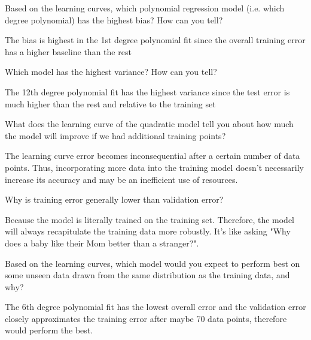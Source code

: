 \begin{solution}
  \end{solution}

\begin{problem}[3]
  Based on the learning curves, which polynomial regression model (i.e. which degree polynomial) has the highest bias? How can you tell?
\end{problem}
\begin{solution}
The bias is highest in the 1st degree polynomial fit since the overall training error has a higher baseline than the rest
\end{solution}

\begin{problem}[3]
  Which model has the highest variance? How can you tell?
\end{problem}
\begin{solution}
  The 12th degree polynomial fit has the highest variance since the test error is much higher than the rest and relative to the training set
\end{solution}

\begin{problem}[3]
  What does the learning curve of the quadratic model tell you about how much the model will improve if we had additional training points?
\end{problem}
\begin{solution}
The learning curve error becomes inconsequential after a certain number of data points. Thus, incorporating more data into the training model doesn't necessarily increase its accuracy and may be an inefficient use of resources.
\end{solution}

\begin{problem}[3]
  Why is training error generally lower than validation error?
\end{problem}
\begin{solution}
  Because the model is literally trained on the training set. Therefore, the model will always recapitulate the training data more robustly. It's like asking "Why does a baby like their Mom better than a stranger?". 
\end{solution}

\begin{problem}[3]
  Based on the learning curves, which model would you expect to perform best on some unseen data drawn from the same distribution as the training data, and why?
\end{problem}
\begin{solution}
  The 6th degree polynomial fit has the lowest overall error and the validation error closely approximates the training error after maybe 70 data points, therefore would perform the best.
\end{solution}




